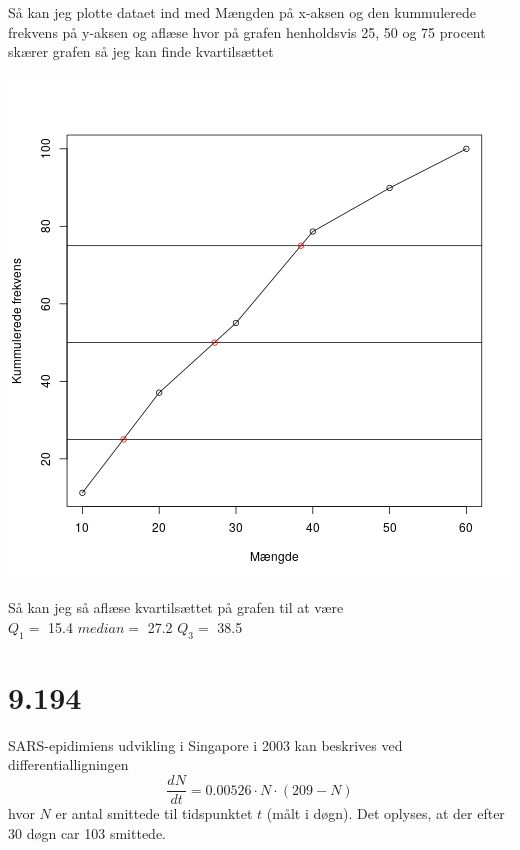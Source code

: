 Så kan jeg plotte dataet ind med Mængden på x-aksen og den kummulerede
frekvens på y-aksen og aflæse hvor på grafen henholdsvis 25, 50 og 75
procent skærer grafen så jeg kan finde kvartilsættet

\includegraphics{figure/unnamed-chunk-4-1.png} \pagebreak

Så kan jeg så aflæse kvartilsættet på grafen til at være\\
\(Q_{1}=\) 15.4 \(median=\) 27.2 \(Q_{3}=\) 38.5

\section{9.194}\label{section-4}

SARS-epidimiens udvikling i Singapore i 2003 kan beskrives ved
differentialligningen \[\frac{dN}{dt}=0.00526 \cdot N \cdot (209 - N)\]
hvor \(N\) er antal smittede til tidspunktet \(t\) (målt i døgn). Det
oplyses, at der efter 30 døgn car 103 smittede.

